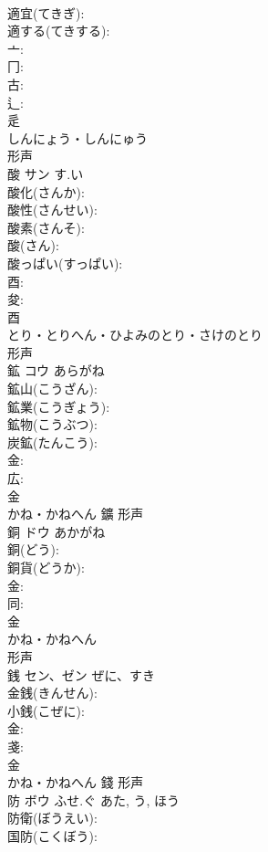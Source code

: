 \documentclass[8pt]{extreport}
\begin{document}
\begin{CJK}{UTF8}{min}
\\	適宜(てきぎ): 
\\	適する(てきする): 
\\	亠: 
\\	冂: 
\\	古: 
\\	辶: 
\\	辵	
\\	しんにょう・しんにゅう	
\\	形声 
\\	酸	サン	す.い		
\\	酸化(さんか): 
\\	酸性(さんせい): 
\\	酸素(さんそ): 
\\	酸(さん): 
\\	酸っぱい(すっぱい): 
\\	酉: 
\\	夋: 
\\	酉	
\\	とり・とりへん・ひよみのとり・さけのとり	
\\	形声 
\\	鉱	コウ	あらがね		
\\	鉱山(こうざん): 
\\	鉱業(こうぎょう): 
\\	鉱物(こうぶつ): 
\\	炭鉱(たんこう): 
\\	金: 
\\	広: 
\\	金	
\\	かね・かねへん	鑛	形声 
\\	銅	ドウ	あかがね		
\\	銅(どう): 
\\	銅貨(どうか): 
\\	金: 
\\	同: 
\\	金	
\\	かね・かねへん	
\\	形声 
\\	銭	セン、ゼン	ぜに、すき		
\\	金銭(きんせん): 
\\	小銭(こぜに): 
\\	金: 
\\	戔: 
\\	金	
\\	かね・かねへん	錢	形声 
\\	防	ボウ	ふせ.ぐ	あた, う, ほう	
\\	防衛(ぼうえい): 
\\	国防(こくぼう): 

\end{CJK}
\end{document}
